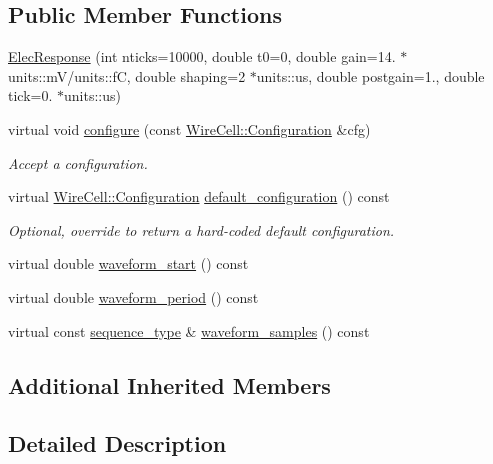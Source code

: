 \subsection*{Public Member Functions}
\begin{DoxyCompactItemize}
\item 
\hyperlink{class_wire_cell_1_1_gen_1_1_elec_response_a35c54a6368bcba44f8a5d8de98b947fe}{Elec\+Response} (int nticks=10000, double t0=0, double gain=14. $\ast$units\+::mV/units\+::fC, double shaping=2 $\ast$units\+::us, double postgain=1., double tick=0. $\ast$units\+::us)
\item 
virtual void \hyperlink{class_wire_cell_1_1_gen_1_1_elec_response_aefafca51074d60af586f6cf90599634c}{configure} (const \hyperlink{namespace_wire_cell_a9f705541fc1d46c608b3d32c182333ee}{Wire\+Cell\+::\+Configuration} \&cfg)
\begin{DoxyCompactList}\small\item\em Accept a configuration. \end{DoxyCompactList}\item 
virtual \hyperlink{namespace_wire_cell_a9f705541fc1d46c608b3d32c182333ee}{Wire\+Cell\+::\+Configuration} \hyperlink{class_wire_cell_1_1_gen_1_1_elec_response_a9b471a619f030a48ff0e5ccec6dca34d}{default\+\_\+configuration} () const
\begin{DoxyCompactList}\small\item\em Optional, override to return a hard-\/coded default configuration. \end{DoxyCompactList}\item 
virtual double \hyperlink{class_wire_cell_1_1_gen_1_1_elec_response_a098956b30d90fb379d538052204011f5}{waveform\+\_\+start} () const
\item 
virtual double \hyperlink{class_wire_cell_1_1_gen_1_1_elec_response_a7e2061fe4702e667aecb29427383a5ce}{waveform\+\_\+period} () const
\item 
virtual const \hyperlink{class_wire_cell_1_1_i_waveform_ad8f85e800ab8082ddbd89ac91164db7d}{sequence\+\_\+type} \& \hyperlink{class_wire_cell_1_1_gen_1_1_elec_response_a78f88dda994c96afaf9b7d82044a46a7}{waveform\+\_\+samples} () const
\end{DoxyCompactItemize}
\subsection*{Additional Inherited Members}


\subsection{Detailed Description}


